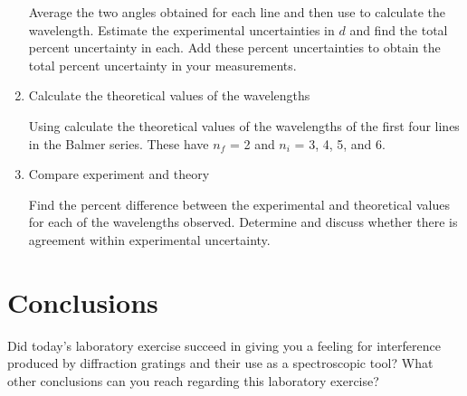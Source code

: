 \begin{multicols}{2}
\begin{enumerate}
	Average the two angles obtained for each line and then use  to calculate the wavelength.  Estimate the experimental uncertainties in $d$ and find the total percent uncertainty in each.  Add these percent uncertainties to obtain the total percent uncertainty in your measurements.
	\item Calculate the theoretical values of the wavelengths
	
	Using  calculate the theoretical values of the wavelengths of the first four lines in the Balmer series.  These have $n_f$ = 2 and $n_i$ = 3, 4, 5, and 6.
	\item Compare experiment and theory
	
	Find the percent difference between the experimental and theoretical values for each of the wavelengths observed. Determine and discuss whether there is agreement within experimental uncertainty. 
\end{enumerate}
\end{multicols} 
\section{Conclusions}
Did today's laboratory exercise succeed in giving you a feeling for interference produced by diffraction gratings and their use as a spectroscopic tool?  What other conclusions can you reach regarding this laboratory exercise?


\endinput
